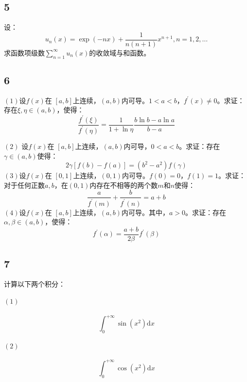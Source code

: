 \documentclass[a4paper,12pt]{article}
\begin{document}
\subsection*{5}\noindent 设：
\begin{equation*}
	u_{n}\left(x\right)=\exp\left(-nx\right)+\frac{1}{n\left(n+1\right)}x^{n+1},n=1,2,\dots
\end{equation*}求函数项级数$\sum_{n=1}^{\infty}u_{n}\left(x\right)$的收敛域与和函数。
\subsection*{6}\noindent$\left(1\right)$设$f(x)$在
$\left[a,b\right]$上连续，$\left(a,b\right)$内可导。$1<a<b$，$f^{\prime}\left(x\right)\neq 0$。求证：存在$\xi,\eta\in\left(a,b\right)$，使得：
\begin{equation*}
	\frac{f^{\prime}\left(\xi\right)}{f^{\prime}\left(\eta\right)}=\frac{1}{1+\ln\eta}\frac{b\ln b-a\ln a}{b-a}
\end{equation*}

\noindent$\left(2\right)$
设$f(x)$在
$\left[a,b\right]$上连续，$\left(a,b\right)$内可导，$0<a<b$。求证：存在$\gamma\in\left(a,b\right)$使得：
\begin{equation*}
	2\gamma\left[f(b)-f(a)\right]=\left(b^2-a^2\right)f\left(\gamma\right)
\end{equation*}
\noindent$\left(3\right)$设$f(x)$在
$\left[0,1\right]$上连续，$\left(0,1\right)$内可导。$f(0)=0$，$f(1)=1$。求证：对于任何正数$a,b$，在$\left(0,1\right)$内存在不相等的两个数$m$和$n$使得：
\begin{equation*}
	\frac{a}{f^{\prime}\left(m\right)}+\frac{b}{f^{\prime}\left(n\right)}=a+b
\end{equation*}
\noindent$\left(4\right)$设$f(x)$在
$\left[a,b\right]$上连续，$\left(a,b\right)$内可导。其中，$a>0$。求证：存在$\alpha,\beta\in\left(a,b\right)$，使得：
\begin{equation*}
	f^{\prime}\left(\alpha\right)=\frac{a+b}{2\beta}f^{\prime}\left(\beta\right)
\end{equation*}
\subsection*{7}计算以下两个积分：\noindent\paragraph{$\left(1\right)$}\begin{equation*}
	\int_{0}^{+\infty}\sin(x^2)\mathrm{d}x
\end{equation*}
\noindent\paragraph{$\left(2\right)$}\begin{equation*}
	\int_{0}^{+\infty}\cos(x^2)\mathrm{d}x
\end{equation*}
\end{document}
